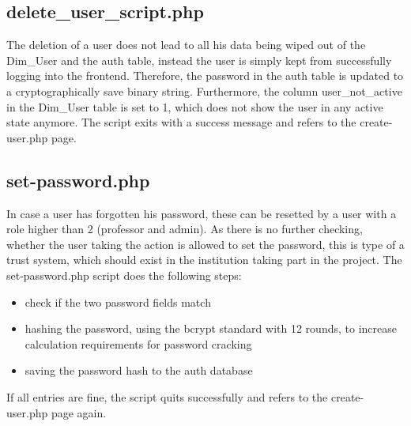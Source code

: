 \subsection{delete\_user\_script.php}
The deletion of a user does not lead to all his data being wiped out of the Dim\_User and the auth table, instead the user is simply kept from successfully logging into the frontend. 
Therefore, the password in the auth table is updated to a cryptographically save binary string. Furthermore, the column user\_not\_active in the Dim\_User table is set to 1, which 
does not show the user in any active state anymore. The script exits with a success message and refers to the create-user.php page.

\subsection{set-password.php}
In case a user has forgotten his password, these can be resetted by a user with a role higher than 2 (professor and admin). As there is no further checking, whether the user taking the action is 
allowed to set the password, this is type of a trust system, which should exist in the institution taking part in the project.
The set-password.php script does the following steps:
\begin{itemize}
\item check if the two password fields match
\item hashing the password, using the bcrypt standard with 12 rounds, to increase calculation requirements for password cracking
\item saving the password hash to the auth database
\end{itemize}
If all entries are fine, the script quits successfully and refers to the create-user.php page again.

